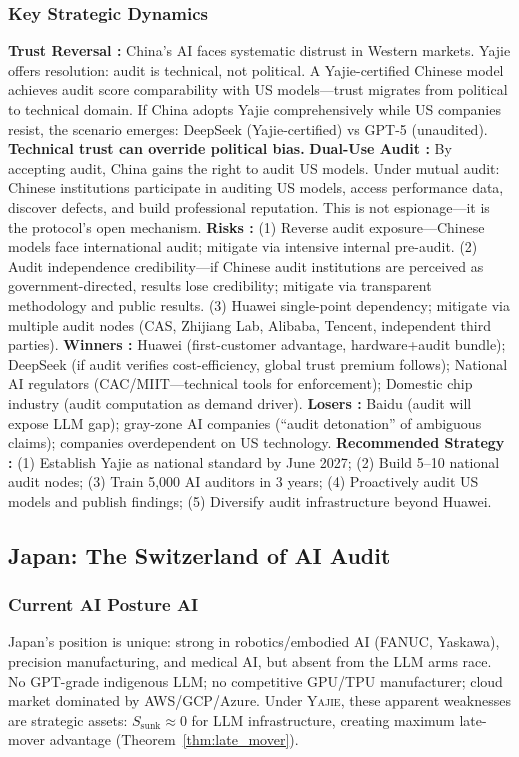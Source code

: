 \documentclass[11pt,a4paper]{article}
\theoremstyle{definition}
\theoremstyle{remark}
\newcommand{\Yajie}{\textsc{Yajie}}
\begin{document}
\subsubsection{Key Strategic Dynamics }
\textbf{Trust Reversal :} China's AI faces systematic distrust in Western markets. Yajie offers resolution: audit is technical, not political. A Yajie-certified Chinese model achieves audit score comparability with US models---trust migrates from political to technical domain. If China adopts Yajie comprehensively while US companies resist, the scenario emerges: DeepSeek (Yajie-certified) vs GPT-5 (unaudited). \textbf{Technical trust can override political bias.}
\textbf{Dual-Use Audit :} By accepting audit, China gains the right to audit US models. Under mutual audit: Chinese institutions participate in auditing US models, access performance data, discover defects, and build professional reputation. This is not espionage---it is the protocol's open mechanism.
\textbf{Risks :} (1) Reverse audit exposure---Chinese models face international audit; mitigate via intensive internal pre-audit. (2) Audit independence credibility---if Chinese audit institutions are perceived as government-directed, results lose credibility; mitigate via transparent methodology and public results. (3) Huawei single-point dependency; mitigate via multiple audit nodes (CAS, Zhijiang Lab, Alibaba, Tencent, independent third parties).
\textbf{Winners :} Huawei (first-customer advantage, hardware+audit bundle); DeepSeek (if audit verifies cost-efficiency, global trust premium follows); National AI regulators (CAC/MIIT---technical tools for enforcement); Domestic chip industry (audit computation as demand driver).
\textbf{Losers :} Baidu (audit will expose LLM gap); gray-zone AI companies (``audit detonation'' of ambiguous claims); companies overdependent on US technology.
\textbf{Recommended Strategy :} (1) Establish Yajie as national standard by June 2027; (2) Build 5--10 national audit nodes; (3) Train 5,000 AI auditors in 3 years; (4) Proactively audit US models and publish findings; (5) Diversify audit infrastructure beyond Huawei.
\subsection{Japan: The Switzerland of AI Audit}
\label{sec:japan}
\subsubsection{Current AI Posture AI}
Japan's position is unique: strong in robotics/embodied AI (FANUC, Yaskawa), precision manufacturing, and medical AI, but absent from the LLM arms race. No GPT-grade indigenous LLM; no competitive GPU/TPU manufacturer; cloud market dominated by AWS/GCP/Azure. Under \Yajie{}, these apparent weaknesses are strategic assets: $S_{\text{sunk}} \approx 0$ for LLM infrastructure, creating maximum late-mover advantage (Theorem~\ref{thm:late_mover}).
\end{document}
